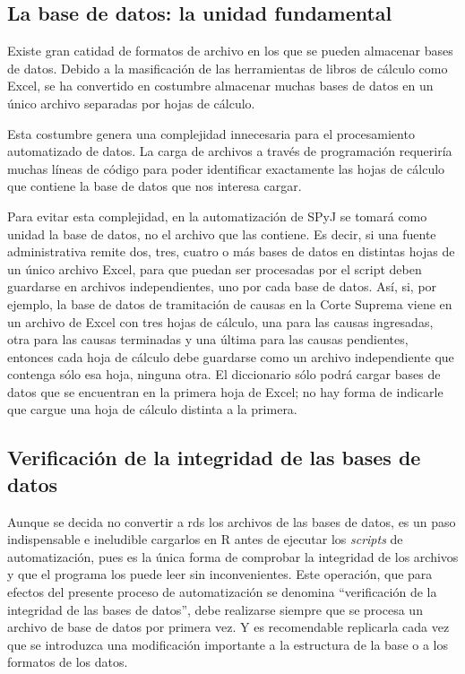 \documentclass[
  spanish,
]{book}
\begin{document}
\hypertarget{la-base-de-datos-la-unidad-fundamental}{%
\subsection{La base de datos: la unidad fundamental}\label{la-base-de-datos-la-unidad-fundamental}}

Existe gran catidad de formatos de archivo en los que se pueden almacenar bases de datos. Debido a la masificación de las herramientas de libros de cálculo como Excel, se ha convertido en costumbre almacenar muchas bases de datos en un único archivo separadas por hojas de cálculo.

Esta costumbre genera una complejidad innecesaria para el procesamiento automatizado de datos. La carga de archivos a través de programación requeriría muchas líneas de código para poder identificar exactamente las hojas de cálculo que contiene la base de datos que nos interesa cargar.

Para evitar esta complejidad, en la automatización de SPyJ se tomará como unidad la base de datos, no el archivo que las contiene. Es decir, si una fuente administrativa remite dos, tres, cuatro o más bases de datos en distintas hojas de un único archivo Excel, para que puedan ser procesadas por el script deben guardarse en archivos independientes, uno por cada base de datos. Así, si, por ejemplo, la base de datos de tramitación de causas en la Corte Suprema viene en un archivo de Excel con tres hojas de cálculo, una para las causas ingresadas, otra para las causas terminadas y una última para las causas pendientes, entonces cada hoja de cálculo debe guardarse como un archivo independiente que contenga sólo esa hoja, ninguna otra. El diccionario sólo podrá cargar bases de datos que se encuentran en la primera hoja de Excel; no hay forma de indicarle que cargue una hoja de cálculo distinta a la primera.

\hypertarget{verificaciuxf3n-de-la-integridad-de-las-bases-de-datos}{%
\subsection{Verificación de la integridad de las bases de datos}\label{verificaciuxf3n-de-la-integridad-de-las-bases-de-datos}}

Aunque se decida no convertir a rds los archivos de las bases de datos, es un paso indispensable e ineludible cargarlos en R antes de ejecutar los \emph{scripts} de automatización, pues es la única forma de comprobar la integridad de los archivos y que el programa los puede leer sin inconvenientes. Este operación, que para efectos del presente proceso de automatización se denomina ``verificación de la integridad de las bases de datos'', debe realizarse siempre que se procesa un archivo de base de datos por primera vez. Y es recomendable replicarla cada vez que se introduzca una modificación importante a la estructura de la base o a los formatos de los datos.
\end{document}
